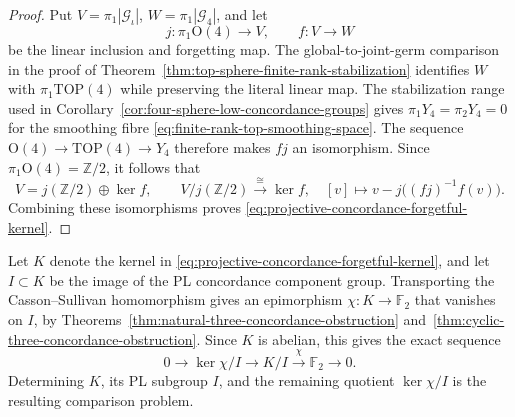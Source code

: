 \begin{proof}
Put $V=\pi_1|\mathcal G_{\iota}|$,
$W=\pi_1|\mathcal G_4|$, and let
\[
 j:\pi_1\mathrm O(4)\longrightarrow V,
 \qquad f:V\longrightarrow W
\]
be the linear inclusion and forgetting map.
The global-to-joint-germ comparison in the proof
of Theorem~\ref{thm:top-sphere-finite-rank-stabilization}
identifies $W$ with $\pi_1\mathrm{TOP}(4)$ while
preserving the literal linear map.  The stabilization
range used in Corollary~\ref{cor:four-sphere-low-concordance-groups}
gives $\pi_1Y_4=\pi_2Y_4=0$ for the smoothing fibre
\eqref{eq:finite-rank-top-smoothing-space}.
The sequence $\mathrm O(4)\to\mathrm{TOP}(4)\to Y_4$
therefore makes $fj$ an isomorphism.  Since
$\pi_1\mathrm O(4)=\mathbb Z/2$, it follows that
\[
 V=j(\mathbb Z/2)\oplus\ker f,
 \qquad
 V/j(\mathbb Z/2)\xrightarrow{\ \cong\ }\ker f,
 \quad [v]\longmapsto v-j\bigl((fj)^{-1}f(v)\bigr).
\]
Combining these isomorphisms proves
\eqref{eq:projective-concordance-forgetful-kernel}.
\end{proof}

Let $K$ denote the kernel in
\eqref{eq:projective-concordance-forgetful-kernel}, and
let $I\subset K$ be the image of the PL concordance
component group.  Transporting the Casson--Sullivan
homomorphism gives an epimorphism
$\chi:K\to\mathbb F_2$ that vanishes on $I$, by
Theorems~\ref{thm:natural-three-concordance-obstruction}
and~\ref{thm:cyclic-three-concordance-obstruction}.
Since $K$ is abelian, this gives the exact sequence
\[
 0\longrightarrow\ker\chi/I\longrightarrow K/I
             \xrightarrow{\ \chi\ }\mathbb F_2\longrightarrow0.
\]
Determining $K$, its PL subgroup $I$, and the remaining
quotient $\ker\chi/I$ is the resulting comparison problem.
